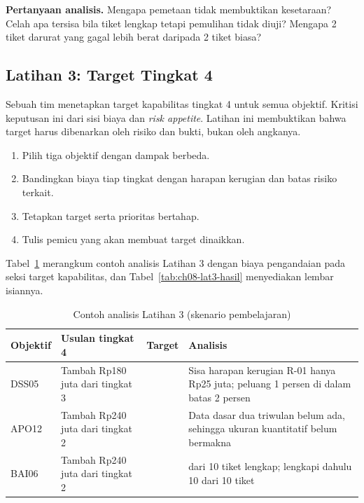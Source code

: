 \textbf{Pertanyaan analisis.} Mengapa pemetaan tidak membuktikan kesetaraan? Celah apa tersisa bila
tiket lengkap tetapi pemulihan tidak diuji? Mengapa 2 tiket darurat yang gagal lebih berat daripada
2 tiket biasa?

\subsection*{Latihan 3: Target Tingkat 4}

Sebuah tim menetapkan target kapabilitas tingkat 4 untuk semua objektif. Kritisi keputusan ini dari
sisi biaya dan \textit{risk appetite}. Latihan ini membuktikan bahwa target harus dibenarkan oleh
risiko dan bukti, bukan oleh angkanya.

\begin{enumerate}
  \item Pilih tiga objektif dengan dampak berbeda.
  \item Bandingkan biaya tiap tingkat dengan harapan kerugian dan batas risiko terkait.
  \item Tetapkan target serta prioritas bertahap.
  \item Tulis pemicu yang akan membuat target dinaikkan.
\end{enumerate}

Tabel~\ref{tab:ch08-lat3-contoh} merangkum contoh analisis Latihan 3 dengan biaya pengandaian pada
seksi target kapabilitas, dan Tabel~\ref{tab:ch08-lat3-hasil} menyediakan lembar isiannya.

\begin{table}[!htb]
  \centering\small
  \caption{Contoh analisis Latihan 3 (skenario pembelajaran)}\label{tab:ch08-lat3-contoh}
  \begin{tabularx}{\textwidth}{|>{\raggedright\arraybackslash}p{}|>{\raggedright\arraybackslash}X|>{\raggedright\arraybackslash}p{}|>{\raggedright\arraybackslash}X|}
    \hline
    \textbf{Objektif} & \textbf{Usulan tingkat 4} & \textbf{Target} & \textbf{Analisis} \\ \hline
    DSS05 & Tambah Rp180 juta dari tingkat 3 & 3 & Sisa harapan kerugian R-01 hanya Rp25 juta;
    peluang 1 persen di dalam batas 2 persen \\ \hline
    APO12 & Tambah Rp240 juta dari tingkat 2 & 2 & Data dasar dua triwulan belum ada, sehingga
    ukuran kuantitatif belum bermakna \\ \hline
    BAI06 & Tambah Rp240 juta dari tingkat 2 & 2 & 8 dari 10 tiket lengkap; lengkapi dahulu 10 dari
    10 tiket \\ \hline
  \end{tabularx}
\end{table}

